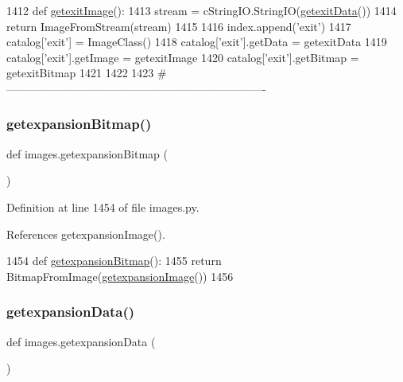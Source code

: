 \begin{DoxyCode}
1412 \textcolor{keyword}{def }\hyperlink{namespaceimages_aae00a8f5f5671e8fd7ed806f7f729f9f}{getexitImage}():
1413     stream = cStringIO.StringIO(\hyperlink{namespaceimages_a7e5bdbd335598e57701536741f4d8997}{getexitData}())
1414     \textcolor{keywordflow}{return} ImageFromStream(stream)
1415 
1416 index.append(\textcolor{stringliteral}{'exit'})
1417 catalog[\textcolor{stringliteral}{'exit'}] = ImageClass()
1418 catalog[\textcolor{stringliteral}{'exit'}].getData = getexitData
1419 catalog[\textcolor{stringliteral}{'exit'}].getImage = getexitImage
1420 catalog[\textcolor{stringliteral}{'exit'}].getBitmap = getexitBitmap
1421 
1422 
1423 \textcolor{comment}{#----------------------------------------------------------------------}
\end{DoxyCode}
\mbox{\label{namespaceimages_a88a6c64335e300a1b0af78ae78cffb41}} 
\subsubsection{\texorpdfstring{getexpansion\+Bitmap()}{getexpansionBitmap()}}
{\footnotesize\ttfamily def images.\+getexpansion\+Bitmap (\begin{DoxyParamCaption}{ }\end{DoxyParamCaption})}



Definition at line 1454 of file images.\+py.



References getexpansion\+Image().


\begin{DoxyCode}
1454 \textcolor{keyword}{def }\hyperlink{namespaceimages_a88a6c64335e300a1b0af78ae78cffb41}{getexpansionBitmap}():
1455     \textcolor{keywordflow}{return} BitmapFromImage(\hyperlink{namespaceimages_aecaae36574467d350121a9514607aaa0}{getexpansionImage}())
1456 
\end{DoxyCode}
\mbox{\label{namespaceimages_ac8cc40b8acd6eebb42a77ab79cc39b24}} 
\subsubsection{\texorpdfstring{getexpansion\+Data()}{getexpansionData()}}
{\footnotesize\ttfamily def images.\+getexpansion\+Data (\begin{DoxyParamCaption}{ }\end{DoxyParamCaption})}



